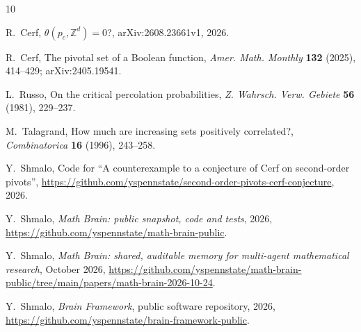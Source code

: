 \documentclass[11pt]{amsart}
\theoremstyle{definition}
\theoremstyle{remark}
\numberwithin{equation}{section}
\begin{document}
\begin{thebibliography}{10}

R.~Cerf, $\theta(p_c,\mathbb Z^d)=0$?, arXiv:2608.23661v1, 2026.

R.~Cerf, The pivotal set of a Boolean function, \emph{Amer. Math. Monthly} \textbf{132} (2025), 414--429; arXiv:2405.19541.

L.~Russo, On the critical percolation probabilities, \emph{Z. Wahrsch. Verw. Gebiete} \textbf{56} (1981), 229--237.

M.~Talagrand, How much are increasing sets positively correlated?, \emph{Combinatorica} \textbf{16} (1996), 243--258.

Y.~Shmalo, Code for ``A counterexample to a conjecture of Cerf on second-order pivots'', \url{https://github.com/yspennstate/second-order-pivots-cerf-conjecture}, 2026.

 Y.~Shmalo, \emph{Math Brain: public snapshot, code and tests}, 2026, \url{https://github.com/yspennstate/math-brain-public}.

 Y.~Shmalo, \emph{Math Brain: shared, auditable memory for multi-agent mathematical research}, October 2026, \url{https://github.com/yspennstate/math-brain-public/tree/main/papers/math-brain-2026-10-24}.

 Y.~Shmalo, \emph{Brain Framework}, public software repository, 2026, \url{https://github.com/yspennstate/brain-framework-public}.

\end{thebibliography}
\end{document}
